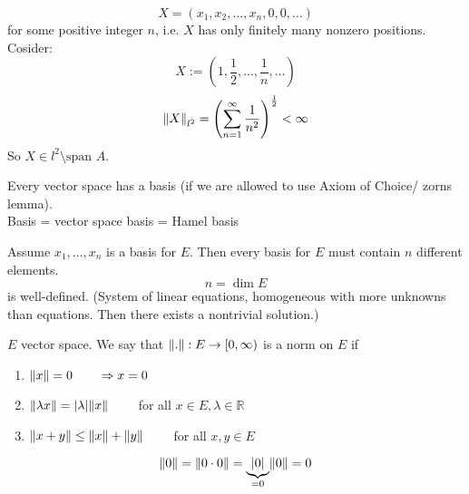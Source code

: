 \begin{beispiele}
\begin{enumerate}[(1)]
		\[
			X = (x_1,x_2, \dots,x_n,0,0,\dots)
		\]
		for some positive integer $n$, i.e. $X$ has only finitely many nonzero positions. \\
		Cosider:
		\[
			X := (1, \frac{1}{2}, \dots, \frac{1}{n}, \dots)
		\]
		\[
			\norm{X}_{l^2} = \left( \sum_{n=1}^{\infty} \frac{1}{n^2} \right)^{\frac{1}{2}} < \infty
		\]
		So $X \in l^2 \setminus \text{span }A$.
		\end{enumerate}
		\begin{bemerkung}
			Every vector space has a basis (if we are allowed to use Axiom of Choice/ zorns lemma). \\ Basis = vector space basis = Hamel basis
		\end{bemerkung}
		Assume $x_1, \dots,x_n$ is a basis for $E$. Then every basis for $E$ must contain $n$ different elements. 
		\[
			n = \dim E
		\]
		is well-defined. (System of linear equations, homogeneous with more unknowns than equations. Then there exists a nontrivial solution.)
	\end{beispiele}
\begin{definition*}[norm]
	$E$ vector space. We say that $\norm{.}: E \to [0,\infty)$ is a norm on $E$ if
	\begin{enumerate}[1)]
		\item $\norm{x}=0 \qquad \Rightarrow x =0$
		\item $\norm{\lambda x} = \abs{\lambda} \norm{x} \qquad $ for all $x \in E, \lambda \in \mathbb{R}$
		\item $\norm{x+y} \leq \norm{x} + \norm{y} \qquad $ for all $x,y \in E$
	\end{enumerate}
	
\end{definition*}
\begin{bemerkung}
	\[
		\norm{0} = \norm{0 \cdot 0} = \underset{=0}{\underbrace{\abs{0}}} \norm{0} = 0
	\]
\end{bemerkung}

